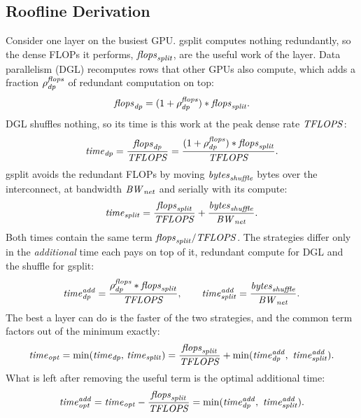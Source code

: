 \subsection{Roofline Derivation}
\label{sec:cm-floor}

Consider one layer on the busiest GPU. gsplit computes nothing redundantly, so the dense FLOPs it
performs, $\mathit{flops}_{\mathit{split}}$, are the useful work of the layer. Data parallelism (DGL) recomputes rows that
other GPUs also compute, which adds a fraction $\rho^{\mathit{flops}}_{\mathit{dp}}$ of redundant computation on top:
\begin{equation}
  \mathit{flops}_{\mathit{dp}} = (1+\rho^{\mathit{flops}}_{\mathit{dp}})\ast \mathit{flops}_{\mathit{split}} .
  \label{eq:flops-dp}
\end{equation}
DGL shuffles nothing, so its time is this work at the peak dense rate $\mathit{TFLOPS}$:
\begin{equation}
  \mathit{time}_{\mathit{dp}} = \frac{\mathit{flops}_{\mathit{dp}}}{\mathit{TFLOPS}} = \frac{(1+\rho^{\mathit{flops}}_{\mathit{dp}})\ast \mathit{flops}_{\mathit{split}}}{\mathit{TFLOPS}} .
  \label{eq:time-dp}
\end{equation}
gsplit avoids the redundant FLOPs by moving $\mathit{bytes}_{\mathit{shuffle}}$ bytes over the interconnect, at bandwidth
$\mathit{BW}_{\mathit{net}}$ and serially with its compute:
\begin{equation}
  \mathit{time}_{\mathit{split}} = \frac{\mathit{flops}_{\mathit{split}}}{\mathit{TFLOPS}} + \frac{\mathit{bytes}_{\mathit{shuffle}}}{\mathit{BW}_{\mathit{net}}} .
  \label{eq:time-gs}
\end{equation}
Both times contain the same term $\mathit{flops}_{\mathit{split}}/\mathit{TFLOPS}$. The strategies differ only in the
\emph{additional} time each pays on top of it, redundant compute for DGL and the shuffle for gsplit:
\begin{equation}
  \mathit{time}^{\mathit{add}}_{\mathit{dp}} = \frac{\rho^{\mathit{flops}}_{\mathit{dp}}\ast \mathit{flops}_{\mathit{split}}}{\mathit{TFLOPS}},
  \qquad
  \mathit{time}^{\mathit{add}}_{\mathit{split}} = \frac{\mathit{bytes}_{\mathit{shuffle}}}{\mathit{BW}_{\mathit{net}}} .
  \label{eq:time-add}
\end{equation}
The best a layer can do is the faster of the two strategies, and the common term factors out of the
minimum exactly:
\begin{equation}
  \mathit{time}_{\mathit{opt}} = \min(\mathit{time}_{\mathit{dp}},\,\mathit{time}_{\mathit{split}})
  = \frac{\mathit{flops}_{\mathit{split}}}{\mathit{TFLOPS}} + \min(\mathit{time}^{\mathit{add}}_{\mathit{dp}},\ \mathit{time}^{\mathit{add}}_{\mathit{split}}) .
  \label{eq:time-opt}
\end{equation}
What is left after removing the useful term is the optimal additional time:
\begin{equation}
  \mathit{time}^{\mathit{add}}_{\mathit{opt}} = \mathit{time}_{\mathit{opt}} - \frac{\mathit{flops}_{\mathit{split}}}{\mathit{TFLOPS}}
   = \min(\mathit{time}^{\mathit{add}}_{\mathit{dp}},\ \mathit{time}^{\mathit{add}}_{\mathit{split}}) .
  \label{eq:floor-overheads}
\end{equation}
